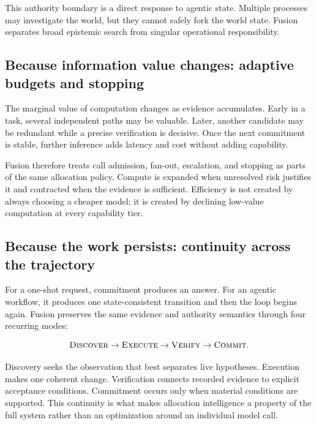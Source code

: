 This authority boundary is a direct response to agentic state. Multiple
processes may investigate the world, but they cannot safely fork the world
state. Fusion separates broad epistemic search from singular operational
responsibility.

\subsection{Because information value changes: adaptive budgets and stopping}

The marginal value of computation changes as evidence accumulates. Early in a
task, several independent paths may be valuable. Later, another candidate may
be redundant while a precise verification is decisive. Once the next
commitment is stable, further inference adds latency and cost without adding
capability.

Fusion therefore treats call admission, fan-out, escalation, and stopping as
parts of the same allocation policy. Compute is expanded when unresolved risk
justifies it and contracted when the evidence is sufficient. Efficiency is not
created by always choosing a cheaper model; it is created by declining
low-value computation at every capability tier.

\subsection{Because the work persists: continuity across the trajectory}

For a one-shot request, commitment produces an answer. For an agentic workflow,
it produces one state-consistent transition and then the loop begins again.
Fusion preserves the same evidence and authority semantics through four
recurring modes:

\begin{equation}
  \textsc{Discover} \rightarrow \textsc{Execute}
  \rightarrow \textsc{Verify} \rightarrow \textsc{Commit}.
\end{equation}

Discovery seeks the observation that best separates live hypotheses. Execution
makes one coherent change. Verification connects recorded evidence to explicit
acceptance conditions. Commitment occurs only when material conditions are
supported. This continuity is what makes allocation intelligence a property of
the full system rather than an optimization around an individual model call.
